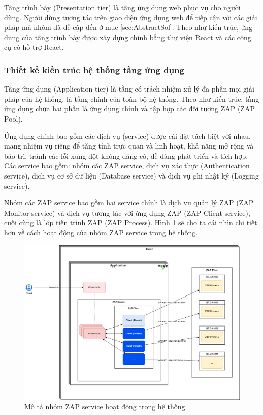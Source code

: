 \tab Tầng trình bày (Presentation tier) là tầng ứng dụng web phục vụ cho người dùng.
Người dùng tương tác trên giao diện ứng dụng web để tiếp cận với các giải pháp mà nhóm đã đề cập đến ở mục \ref{sec:AbstractSol}.
Theo như kiến trúc, ứng dụng của tầng trình bày được xây dựng chính bằng thư viện React và các công cụ có hỗ trợ React.

\subsubsection{Thiết kế kiến trúc hệ thống tầng ứng dụng}

\tab Tầng ứng dụng (Application tier) là tầng có trách nhiệm xử lý đa phần mọi giải pháp của hệ thống, là tầng chính của toàn bộ hệ thống.
Theo như kiến trúc, tầng ứng dụng chứa hai phần là ứng dụng chính và tập hợp các đối tượng ZAP (ZAP Pool).
\par

Ứng dụng chính bao gồm các dịch vụ (service) được cài đặt tách biệt với nhau, mang nhiệm vụ riêng để tăng tính trực quan và linh hoạt, khả năng mở rộng và bảo trì, tránh các lỗi xung đột không đáng có, dễ dàng phát triển và tích hợp.
Các service bao gồm: nhóm các ZAP service, dịch vụ xác thực (Authentication service), dịch vụ cơ sở dữ liệu (Database service) và dịch vụ ghi nhật ký (Logging service).
\par

\tab \tab Nhóm các ZAP service bao gồm hai service chính là dịch vụ quản lý ZAP (ZAP Monitor service) và dịch vụ tương tác với ứng dụng ZAP (ZAP Client service), cuối cùng là lớp tiến trình ZAP (ZAP Process).
Hình \ref{fig:NhomZapServiceHoatDong} sẽ cho ta cái nhìn chi tiết hơn về cách hoạt động của nhóm ZAP service trong hệ thống.

\begin{figure}[H]
      \centering
      \includegraphics[width=\textwidth]{applied-thesis-chapters/chapter-3/Mô tả nhóm ZAP service hoạt động trong hệ thống.png}
      \caption{Mô tả nhóm ZAP service hoạt động trong hệ thống}
      \label{fig:NhomZapServiceHoatDong}
\end{figure}

